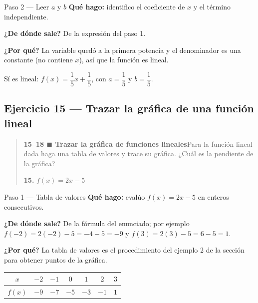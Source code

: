 \documentclass[11pt]{article}
\begin{document}
\begin{paso}{Paso 2 --- Leer $a$ y $b$}
\textbf{Qué hago:} identifico el coeficiente de $x$ y el término independiente.

\textbf{¿De dónde sale?} De la expresión del paso 1.

\textbf{¿Por qué?} La variable quedó a la primera potencia y el denominador es una constante (no contiene $x$), así que la función es lineal.
\end{paso}

\begin{resp}
Sí es lineal: $f(x)=\dfrac{1}{5}x+\dfrac{1}{5}$, con $a=\dfrac15$ y $b=\dfrac15$.
\end{resp}

\subsection*{Ejercicio 15 — Trazar la gráfica de una función lineal}

\begin{quote}
\textbf{15--18 $\blacksquare$ Trazar la gráfica de funciones lineales}\quad Para la función lineal dada haga una tabla de valores y trace su gráfica. ¿Cuál es la pendiente de la gráfica?

\textbf{15.} $f(x)=2x-5$
\end{quote}

\begin{paso}{Paso 1 --- Tabla de valores}
\textbf{Qué hago:} evalúo $f(x)=2x-5$ en enteros consecutivos.

\textbf{¿De dónde sale?} De la fórmula del enunciado; por ejemplo $f(-2)=2(-2)-5=-4-5=-9$ y $f(3)=2(3)-5=6-5=1$.

\textbf{¿Por qué?} La tabla de valores es el procedimiento del ejemplo 2 de la sección para obtener puntos de la gráfica.
\begin{center}
\begin{tabular}{c|cccccc}
$x$ & $-2$ & $-1$ & $0$ & $1$ & $2$ & $3$\\ \hline
$f(x)$ & $-9$ & $-7$ & $-5$ & $-3$ & $-1$ & $1$
\end{tabular}
\end{center}
\end{paso}
\end{document}
